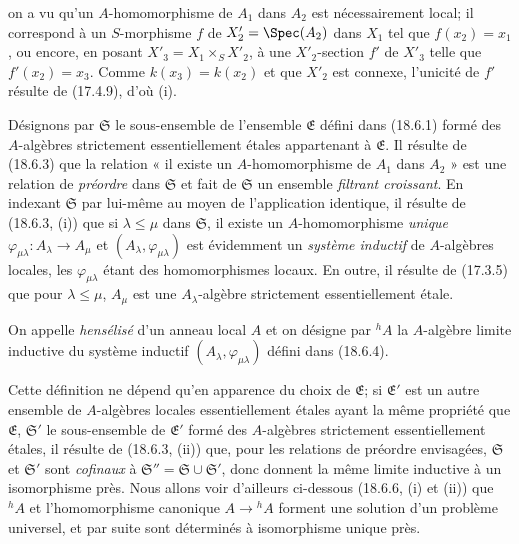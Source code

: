 
on a vu qu'un $A$-homomorphisme de $A_1$ dans $A_2$ est nécessairement local; il correspond à un $S$-morphisme $f$ de $X'_2=\Spec(A_2)$ dans $X_1$ tel que $f(x_2)=x_1$, ou encore, en posant $X'_3=X_1\times_S X'_2$, à une $X'_2$-section $f'$ de $X'_3$ telle que $f'(x_2)=x_3$. Comme $k(x_3)=k(x_2)$ et que $X'_2$ est connexe, l'unicité de $f'$ résulte de (17.4.9), d'où (i).

\begin{env}[18.6.4]
\label{IV.18.6.4}
Désignons par $\mathfrak S$ le sous-ensemble de l'ensemble $\mathfrak E$ défini dans (18.6.1) formé des $A$-algèbres strictement essentiellement étales appartenant à $\mathfrak E$. Il résulte de (18.6.3) que la relation « il existe un $A$-homomorphisme de $A_1$ dans $A_2$ » est une relation de \emph{préordre} dans $\mathfrak S$ et fait de $\mathfrak S$ un ensemble \emph{filtrant croissant}. En indexant $\mathfrak S$ par lui-même au moyen de l'application identique, il résulte de (18.6.3, (i)) que si $\lambda\leq\mu$ dans $\mathfrak S$, il existe un $A$-homomorphisme \emph{unique} $\varphi_{\mu\lambda}:A_\lambda\to A_\mu$ et $(A_\lambda,\varphi_{\mu\lambda})$ est évidemment un \emph{système inductif} de $A$-algèbres locales, les $\varphi_{\mu\lambda}$ étant des homomorphismes locaux. En outre, il résulte de (17.3.5) que pour $\lambda\leq\mu$, $A_\mu$ est une $A_\lambda$-algèbre strictement essentiellement étale.
\end{env}

\begin{definition}[18.6.5]
On appelle \emph{hensélisé} d'un anneau local $A$ et on désigne par ${}^h\!A$ la $A$-algèbre limite inductive du système inductif $(A_\lambda,\varphi_{\mu\lambda})$ défini dans (18.6.4).
\end{definition}

Cette définition ne dépend qu'en apparence du choix de $\mathfrak E$; si $\mathfrak E'$ est un autre ensemble de $A$-algèbres locales essentiellement étales ayant la même propriété que $\mathfrak E$, $\mathfrak S'$ le sous-ensemble de $\mathfrak E'$ formé des $A$-algèbres strictement essentiellement étales, il résulte de (18.6.3, (ii)) que, pour les relations de préordre envisagées, $\mathfrak S$ et $\mathfrak S'$ sont \emph{cofinaux} à $\mathfrak S''=\mathfrak S\cup\mathfrak S'$, donc donnent la même limite inductive à un isomorphisme près. Nous allons voir d'ailleurs ci-dessous (18.6.6, (i) et (ii)) que ${}^h\!A$ et l'homomorphisme canonique $A\to{}^h\!A$ forment une solution d'un problème universel, et par suite sont déterminés à isomorphisme unique près.

